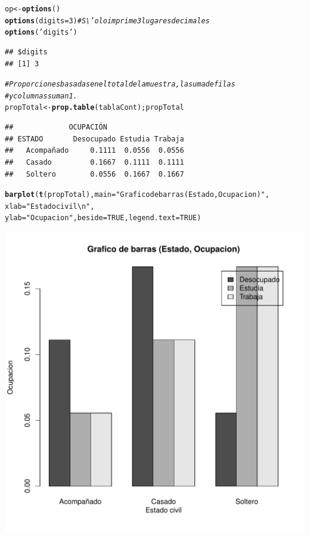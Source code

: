 \documentclass[12pt,letterpaper]{article}\usepackage[]{graphicx}\usepackage[]{color}
\makeatletter
\def\maxwidth{ %
  \ifdim\Gin@nat@width>\linewidth
    \linewidth
  \else
    \Gin@nat@width
  \fi
}
\newcommand{\hlnum}[1]{\textcolor[rgb]{0.686,0.059,0.569}{#1}}%
\newcommand{\hlstr}[1]{\textcolor[rgb]{0.192,0.494,0.8}{#1}}%
\newcommand{\hlcom}[1]{\textcolor[rgb]{0.678,0.584,0.686}{\textit{#1}}}%
\newcommand{\hlstd}[1]{\textcolor[rgb]{0.345,0.345,0.345}{#1}}%
\newcommand{\hlkwb}[1]{\textcolor[rgb]{0.69,0.353,0.396}{#1}}%
\newcommand{\hlkwc}[1]{\textcolor[rgb]{0.333,0.667,0.333}{#1}}%
\newcommand{\hlkwd}[1]{\textcolor[rgb]{0.737,0.353,0.396}{\textbf{#1}}}%
\newenvironment{kframe}{%
 \def\at@end@of@kframe{}%
 \ifinner\ifhmode%
  \def\at@end@of@kframe{\end{minipage}}%
  \begin{minipage}{\columnwidth}%
 \fi\fi%
 \def\FrameCommand##1{\hskip\@totalleftmargin \hskip-\fboxsep
 \colorbox{shadecolor}{##1}\hskip-\fboxsep
     \hskip-\linewidth \hskip-\@totalleftmargin \hskip\columnwidth}%
 \MakeFramed {\advance\hsize-\width
   \@totalleftmargin\z@ \linewidth\hsize
   \@setminipage}}%
 {\par\unskip\endMakeFramed%
 \at@end@of@kframe}
\newenvironment{knitrout}{}{} %
\makeatother
\begin{document}
\begin{knitrout}
\color{fgcolor}\begin{kframe}
\begin{alltt}
\hlstd{op} \hlkwb{<-} \hlkwd{options}\hlstd{()}
\hlkwd{options}\hlstd{(}\hlkwc{digits}\hlstd{=}\hlnum{3}\hlstd{)} \hlcom{# S\textbackslash{}'olo imprime 3 lugares decimales}
\hlkwd{options}\hlstd{(}\hlstr{'digits'}\hlstd{)}
\end{alltt}
\begin{verbatim}
## $digits
## [1] 3
\end{verbatim}
\begin{alltt}
\hlcom{# Proporciones basadas en el total de la muestra, la suma de filas }
\hlcom{# y columnas suman 1.}
\hlstd{propTotal} \hlkwb{<-} \hlkwd{prop.table}\hlstd{(tablaCont); propTotal}
\end{alltt}
\begin{verbatim}
##             OCUPACIÓN
## ESTADO       Desocupado Estudia Trabaja
##   Acompañado     0.1111  0.0556  0.0556
##   Casado         0.1667  0.1111  0.1111
##   Soltero        0.0556  0.1667  0.1667
\end{verbatim}
\begin{alltt}
\hlkwd{barplot}\hlstd{(}\hlkwd{t}\hlstd{(propTotal),} \hlkwc{main}\hlstd{=}\hlstr{"Grafico de barras (Estado, Ocupacion)"}\hlstd{,}
        \hlkwc{xlab}\hlstd{=}\hlstr{"Estado civil\textbackslash{}n"}\hlstd{,}
\hlkwc{ylab}\hlstd{=}\hlstr{"Ocupacion"}\hlstd{,} \hlkwc{beside}\hlstd{=}\hlnum{TRUE}\hlstd{,} \hlkwc{legend.text}\hlstd{=}\hlnum{TRUE}\hlstd{)}
\end{alltt}
\end{kframe}
\includegraphics[width=\maxwidth]{figure/unnamed-chunk-7-1} 

\end{knitrout}
\end{document}
